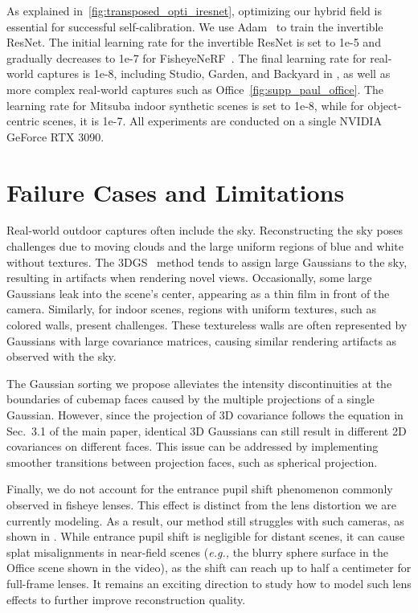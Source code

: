 As explained in~\cref{fig:transposed_opti_iresnet}, optimizing our hybrid field is essential for successful self-calibration. 
We use Adam~\cite{kingma2014adam} to train the invertible ResNet. 
The initial learning rate for the invertible ResNet is set to 1e-5 and gradually decreases to 1e-7 for FisheyeNeRF~\cite{jeong2021self}. 
The final learning rate for real-world captures is 1e-8, including Studio, Garden, and Backyard in , as well as more complex real-world captures such as Office~\cref{fig:supp_paul_office}. 
The learning rate for Mitsuba indoor synthetic scenes is set to 1e-8, while for object-centric scenes, it is 1e-7.
All experiments are conducted on a single NVIDIA GeForce RTX 3090.


\section{Failure Cases and Limitations}
Real-world outdoor captures often include the sky.
Reconstructing the sky poses challenges due to moving clouds and the large uniform regions of blue and white without textures. 
The 3DGS~\cite{kerbl20233d} method tends to assign large Gaussians to the sky, resulting in artifacts when rendering novel views. 
Occasionally, some large Gaussians leak into the scene's center, appearing as a thin film in front of the camera. 
Similarly, for indoor scenes, regions with uniform textures, such as colored walls, present challenges. 
These textureless walls are often represented by Gaussians with large covariance matrices, causing similar rendering artifacts as observed with the sky.

The Gaussian sorting we propose alleviates the intensity discontinuities at the boundaries of cubemap faces caused by the multiple projections of a single Gaussian. 
However, since the projection of 3D covariance follows the equation in Sec.~3.1 of the main paper, identical 3D Gaussians can still result in different 2D covariances on different faces. 
This issue can be addressed by implementing smoother transitions between projection faces, such as spherical projection.

Finally, we do not account for the entrance pupil shift phenomenon commonly observed in fisheye lenses.
This effect is distinct from the lens distortion we are currently modeling. 
As a result, our method still struggles with such cameras, as shown in . 
While entrance pupil shift is negligible for distant scenes, it can cause splat misalignments in near-field scenes (\textit{e.g.,} the blurry sphere surface in the Office scene shown in the video), as the shift can reach up to half a centimeter for full-frame lenses.
It remains an exciting direction to study how to model such lens effects to further improve reconstruction quality.
